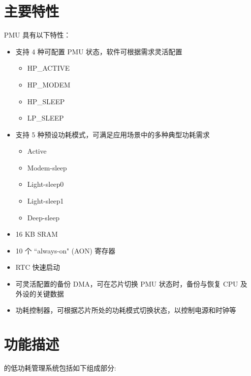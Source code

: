 \documentclass[main\_\_CN.tex]{subfiles}
\begin{document}
\section{主要特性}

PMU 具有以下特性：

\begin{itemize}
    \item 支持 4 种可配置 PMU 状态，软件可根据需求灵活配置
    \begin{itemize}
        \item HP\_ACTIVE
        \item HP\_MODEM
        \item HP\_SLEEP
        \item LP\_SLEEP
    \end{itemize}
    \item 支持 5 种预设功耗模式，可满足应用场景中的多种典型功耗需求
    \begin{itemize}
        \item Active
        \item Modem-sleep
        \item Light-sleep0
        \item Light-sleep1
        \item Deep-sleep
    \end{itemize}
    \item 16 KB SRAM
    \item 10 个 ``always-on" (AON) 寄存器
    \item RTC 快速启动
    \item 可灵活配置的备份 DMA，可在芯片切换 PMU 状态时，备份与恢复 CPU 及外设的关键数据
    \item 功耗控制器，可根据芯片所处的功耗模式切换状态，以控制电源和时钟等
\end{itemize}

\section{功能描述}

\chipname{} 的低功耗管理系统包括如下组成部分:
\end{document}
